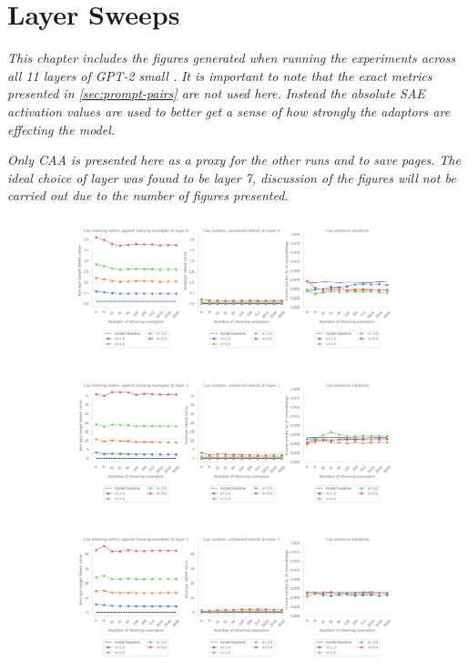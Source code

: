 \chapter{Layer Sweeps}

\emph{This chapter includes the figures generated when running the experiments across all 11 layers of GPT-2 small \citep{saelens}.}
\emph{It is important to note that the exact metrics presented in \cref{sec:prompt-pairs} are not used here.}
\emph{Instead the absolute SAE activation values are used to better get a sense of how strongly the adaptors are effecting the model.}

\emph{Only CAA is presented here as a proxy for the other runs and to save pages.}
\emph{The ideal choice of layer was found to be layer 7, discussion of the figures will not be carried out due to the number of figures presented.}

\begin{figure}
    \centering
        \includegraphics[width=\textwidth]{figures/gpt2_sweep_0.png}
        \label{fig:0}
\end{figure}

\begin{figure}
    \centering
        \includegraphics[width=\textwidth]{figures/gpt2_sweep_1.png}
        \label{fig:1}
\end{figure}

\begin{figure}
    \centering
        \includegraphics[width=\textwidth]{figures/gpt2_sweep_2.png}
        \label{fig:2}
\end{figure}

